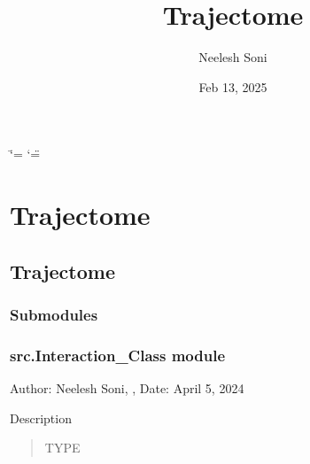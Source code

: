 \documentclass[letterpaper,10pt,english]{sphinxmanual}
\title{Trajectome}
\date{Feb 13, 2025}
\author{Neelesh Soni}
\begin{document}
\ifdefined\shorthandoff
  \ifnum\catcode`\=\string=\active\shorthandoff{=}\fi
  \ifnum\catcode`\"=\active{}\fi
\fi

\pagestyle{empty}
\sphinxmaketitle
\pagestyle{plain}
\sphinxtableofcontents
\pagestyle{normal}
\label{\detokenize{index::doc}}


\sphinxstepscope


\chapter{Trajectome}
\label{\detokenize{modules:trajectome}}\label{\detokenize{modules::doc}}
\sphinxstepscope


\section{Trajectome}
\label{\detokenize{src:trajectome}}\label{\detokenize{src::doc}}

\subsection{Submodules}
\label{\detokenize{src:submodules}}

\subsection{src.Interaction\_Class module}
\label{\detokenize{src:module-src.Interaction_Class}}\label{\detokenize{src:src-interaction-class-module}}
\sphinxAtStartPar
Author: Neelesh Soni, , 
Date: April 5, 2024

\begin{fulllineitems}
\label{\detokenize{src:src.Interaction_Class.logger}}
\pysigstartsignatures
{}
\pysigstopsignatures
\sphinxAtStartPar
Description
\begin{quote}\begin{description}
\sphinxAtStartPar
TYPE

\end{description}\end{quote}

\end{fulllineitems}
\end{document}
